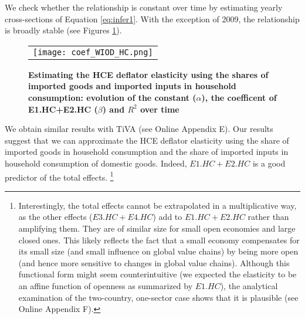 \documentclass[11pt,a4paper]{paper} %
\begin{document}
We check whether the relationship is constant over time by estimating yearly cross-sections of Equation \ref{eq:infer1}. 
With the exception of 2009, the relationship is broadly stable (see Figures \ref{fig:evolution_coef}).

\begin{figure}[H]
\centering
\caption{\footnotesize{\textbf{Estimating the HCE deflator elasticity using the shares of imported goods and imported inputs in household consumption: evolution of the constant ($\alpha$), the coefficent of E1.HC+E2.HC ($\beta$) and $R^2$ over time}}}
\begin{tabular}{c}
\texttt{[image: coef\_WIOD\_HC.png]}\\
\end{tabular}
\label{fig:evolution_coef}
\end{figure}

We obtain similar results with TiVA (see Online Appendix E). 
Our results suggest that we can approximate the HCE deflator elasticity using the share of imported goods in household consumption and the share of imported inputs in household consumption of domestic goods. Indeed, $E1.HC+E2.HC$ is a good predictor of the total effects.
\footnote{Interestingly, the total effects cannot be extrapolated in a multiplicative way, as the other effects ($E3.HC+E4.HC$) add to $E1.HC+E2.HC$ rather than amplifying them.
They are of similar size for small open economies and large closed ones.
This likely reflects the fact that a small economy compensates for its small size (and small influence on global value chains) by being more open (and hence more sensitive to changes in global value chains). Although this functional form might seem counterintuitive (we expected the elasticity to be an affine function of openness as summarized by $E1.HC$), the analytical examination of the two-country, one-sector case shows that it is plausible (see Online Appendix F).}
\end{document}
